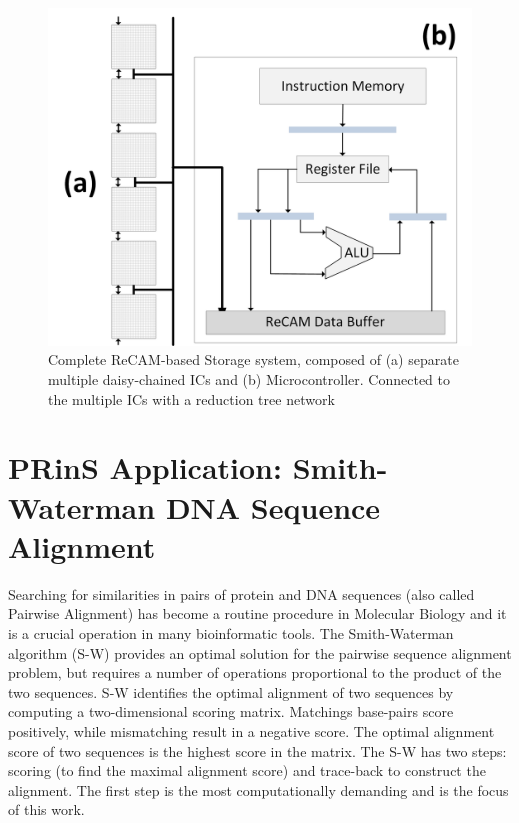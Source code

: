 \documentclass{superfri}
\begin{document}
	\begin{figure}[h!]
		\centerline{\includegraphics[scale=0.5]{Figures/ReCAM_Single_IC_Column.jpg}}
		\caption{Complete ReCAM-based Storage system, composed of (a) separate multiple daisy-chained ICs and (b) Microcontroller. Connected to the multiple ICs with a reduction tree network}
		\label{fig:ReCAM_system}
	\end{figure}
	
	\section{PRinS Application: Smith-Waterman DNA Sequence Alignment}
	\label{sec:smith_waterman}
	
	Searching for similarities in pairs of protein and DNA sequences (also called Pairwise Alignment) has become a routine procedure in Molecular Biology and it is a crucial operation in many bioinformatic tools. The Smith-Waterman algorithm (S-W) \cite{smith1981identification} provides an optimal solution for the pairwise sequence alignment problem, but requires a number of operations proportional to the product of the two sequences. 
	S-W identifies the optimal alignment of two sequences by computing a two-dimensional scoring matrix. Matchings base-pairs score positively, while mismatching result in a negative score. The optimal alignment score of two sequences is the highest score in the matrix. The S-W has two steps: scoring (to find the maximal alignment score) and trace-back to construct the alignment. The first step is the most computationally demanding and is the focus of this work.
	
\end{document}
